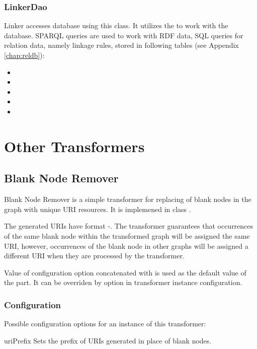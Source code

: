 \subsubsection{LinkerDao}

Linker accesses database using this class. It utilizes the  to work with the database. SPARQL queries are used to work with RDF data, SQL queries for relation data, namely linkage rules, stored in following tables  (see Appendix \ref{chap:reldb}):

\begin{itemize}
	\item {}
	\item {}	 
	\item {}
	\item {}
	\item {}
\end{itemize}

\section{Other Transformers}
\subsection{Blank Node Remover}
Blank Node Remover is a simple transformer for replacing of blank nodes in the  graph with unique URI resources. It is implemened in class .

The generated URIs have format {-}. The transformer guarantees that occurrences of the same blank node within the transformed graph
 will be assigned the same URI, however, occurrences of the blank node in other graphs will be assigned a different URI when they are processed by the transformer.

Value of  configuration option concatenated with  is used as the default value of the  part. It can be overriden by  option in transformer instance configuration.

\subsubsection{Configuration}
Possible configuration options for an instance of this transformer:
\begin{configlist}
	\item[uriPrefix] Sets the prefix of URIs generated in place of blank nodes.
\end{configlist}

